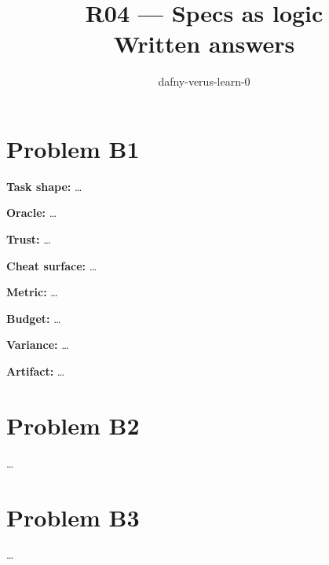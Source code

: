\documentclass[11pt]{article}
\title{R04 --- Specs as logic \\ \large Written answers}
\author{dafny-verus-learn-0}
\date{}
\begin{document}
\maketitle
\section*{Problem B1}\label{ans:B1}
\begin{answer}
\textbf{Task shape:} \dots

\textbf{Oracle:} \dots

\textbf{Trust:} \dots

\textbf{Cheat surface:} \dots

\textbf{Metric:} \dots

\textbf{Budget:} \dots

\textbf{Variance:} \dots

\textbf{Artifact:} \dots
\end{answer}
\section*{Problem B2}\label{ans:B2}
\begin{answer}
\dots
\end{answer}
\section*{Problem B3}\label{ans:B3}
\begin{answer}
\dots
\end{answer}
\end{document}
